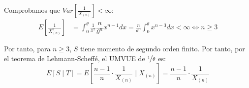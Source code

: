\begin{ejemplo}
    Comprobamos que $Var\left[\frac{1}{X_{(n)}}\right] < \infty$:
    \begin{align*}
        E\left[\frac{1}{X_{(n)}^2}\right] &= \int_0^\theta \frac{1}{x^2} \dfrac{n}{\theta^n} x^{n-1} dx = \frac{n}{\theta^n} \int_0^\theta x^{n-3} dx <\infty \iff n\geq 3
    \end{align*}

    Por tanto, para $n \geq 3$, $S$ tiene momento de segundo orden finito. Por tanto, por el teorema de Lehmann-Scheffé, el UMVUE de $\nicefrac{1}{\theta}$ es:
    \begin{equation*}
        E[S \mid T] = E\left[\frac{n-1}{n} \cdot \frac{1}{X_{(n)}} \mid X_{(n)}\right] = \frac{n-1}{n} \cdot \frac{1}{X_{(n)}}
    \end{equation*}
\end{ejemplo}

